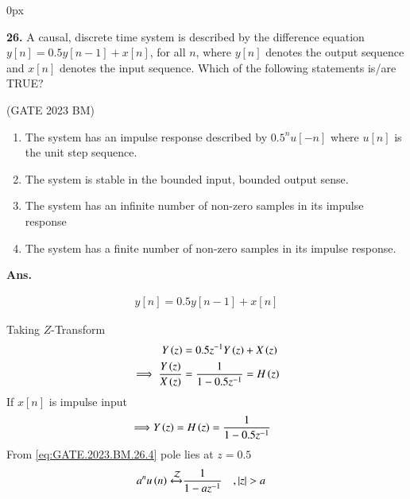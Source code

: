 \documentclass[journal,12pt,twocolumn]{IEEEtran}
\begin{document}
\parindent 0px


\vspace{3cm}

\title{}
\author{EE23BTECH11042 -  Khusinadha Naik$^{*}$
}
\maketitle
\newpage
\bigskip



\noindent \textbf{26.} \hspace{2pt}A causal, discrete time system is described by the difference equation $y[n] = 0.5 y[n-1] + x[n]$, for all $n$, where $y[n]$ denotes the output sequence and $x[n]$ denotes the input sequence. Which of the following statements is/are TRUE?
\begin{flushright}
\hfill(GATE 2023 BM)
\end{flushright}
\begin{enumerate}[label = (\alph*)]
	\item The system has an impulse response described by $0.5^{n} u[-n]$ where $u[n]$ is the  
unit step sequence. 	\label{option:GATE.2023.BM.26.1}	
	\item The system is stable in the bounded input, bounded output sense.		\label{option:GATE.2023.BM.26.2}
	\item The system has an infinite number of non-zero samples in its impulse response	\label{option:GATE.2023.BM.26.3}
	\item The system has a finite number of non-zero samples in its impulse response.	\label{option:GATE.2023.BM.26.4}
\end{enumerate}

\noindent \textbf{Ans.}\\
\fi
\begin{table}[h]

\end{table}
\begin{align}
y[n] = 0.5y[n-1] + x[n] 
\end{align}

Taking $Z$-Transform 
\begin{align}
Y\left(z\right) &= 0.5z^{-1}Y\left(z\right) + X\left(z\right) \\
\implies \frac{Y\left(z\right)}{X\left(z\right)} &= \frac{1}{1 - 0.5z^{-1}} = H\left(z\right) 
\end{align}
If $x[n]$ is impulse input 
\begin{align}
\implies &Y\left(z\right) = H\left(z\right) = \frac{1}{1 - 0.5z^{-1}}  \label{eq:GATE.2023.BM.26.4}
\end{align}
From \eqref{eq:GATE.2023.BM.26.4} pole lies at $z = 0.5$
\begin{align}
a^{n}u\left(n\right) \xleftrightarrow{\mathcal{Z}} &\frac{1}{1 - az^{-1}} \quad , \left\vert z\right\vert > a \label{eq:GATE.2023.BM.26.5}
\end{align}
\end{document}
